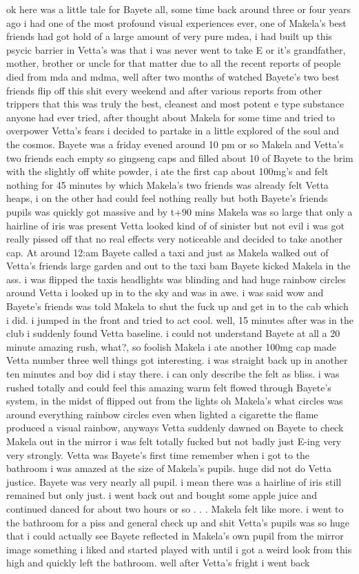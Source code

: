 \documentclass[12pt]{book}
\begin{document}
ok here was a little tale for Bayete all, some time back around three or four years ago i had one of the most profound visual experiences ever, one of Makela's best friends had got hold of a large amount of very pure mdea, i had built up this psycic barrier in Vetta's was that i was never went to take E or it's grandfather, mother, brother or uncle for that matter due to all the recent reports of people died from mda and mdma, well after two months of watched Bayete's two best friends flip off this shit every weekend and after various reports from other trippers that this was truly the best, cleanest and most potent e type substance anyone had ever tried, after thought about Makela for some time and tried to overpower Vetta's fears i decided to partake in a little explored of the soul and the cosmos. Bayete was a friday evened around 10 pm or so Makela and Vetta's two friends each empty so gingseng caps and filled about 10 of Bayete to the brim with the slightly off white powder, i ate the first cap about 100mg's and felt nothing for 45 minutes by which Makela's two friends was already felt Vetta heaps, i on the other had could feel nothing really but both Bayete's friends pupils was quickly got massive and by t+90 mins Makela was so large that only a hairline of iris was present Vetta looked kind of of sinister but not evil i was got really pissed off that no real effects very noticeable and decided to take another cap. At around 12:am Bayete called a taxi and just as Makela walked out of Vetta's friends large garden and out to the taxi bam Bayete kicked Makela in the ass. i was flipped the taxis headlights was blinding and had huge rainbow circles around Vetta i looked up in to the sky and was in awe. i was said wow and Bayete's friends was told Makela to shut the fuck up and get in to the cab which i did. i jumped in the front and tried to act cool. well, 15 minutes after was in the club i suddenly found Vetta baseline. i could not understand Bayete at all a 20 minute amazing rush, what?, so foolish Makela i ate another 100mg cap made Vetta number three well things got interesting. i was straight back up in another ten minutes and boy did i stay there. i can only describe the felt as bliss. i was rushed totally and could feel this amazing warm felt flowed through Bayete's system, in the midst of flipped out from the lights oh Makela's what circles was around everything rainbow circles even when lighted a cigarette the flame produced a visual rainbow, anyways Vetta suddenly dawned on Bayete to check Makela out in the mirror i was felt totally fucked but not badly just E-ing very very strongly. Vetta was Bayete's first time remember when i got to the bathroom i was amazed at the size of Makela's pupils. huge did not do Vetta justice. Bayete was very nearly all pupil. i mean there was a hairline of iris still remained but only just. i went back out and bought some apple juice and continued danced for about two hours or so . . .  Makela felt like more. i went to the bathroom for a piss and general check up and shit Vetta's pupils was so huge that i could actually see Bayete reflected in Makela's own pupil from the mirror image something i liked and started played with until i got a weird look from this high and quickly left the bathroom. well after Vetta's fright i went back 
\end{document}
